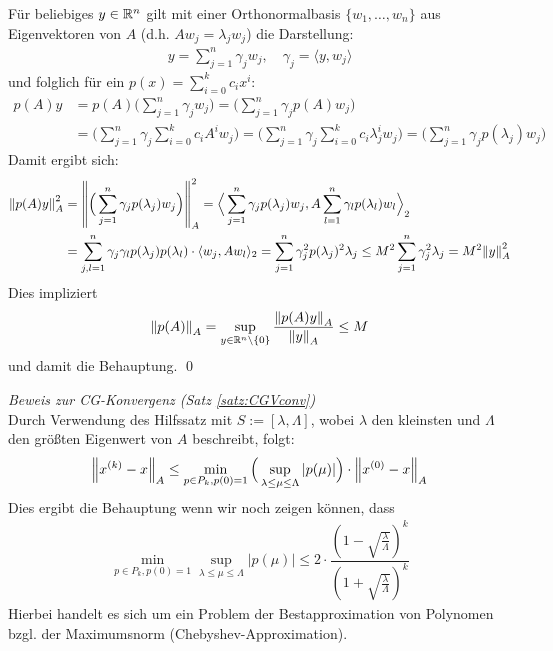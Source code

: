 Für beliebiges $y\in\mathbb R^n$ gilt mit einer Orthonormalbasis $\{w_1,\dots,w_n\}$ aus Eigenvektoren von $A$ 
(d.h. $Aw_j = \lambda_jw_j$) die Darstellung:
%
\begin{align*}
  y=\sum_{j=1}^{n}\gamma_j w_j,
  \quad \gamma_j = \langle y, w_j\rangle
\end{align*}
%
und folglich für ein $p(x) = \sum_{i=0}^{k} c_i x^i$:
\begin{align*}
  p(A)y 
  &= p(A) \Bigg(\sum_{j=1}^{n}\gamma_j w_j \Bigg) 
  = \Bigg(\sum_{j=1}^{n}\gamma_j p(A)w_j \Bigg) \\
  &= \Bigg(\sum_{j=1}^{n}\gamma_j \sum_{i=0}^{k} c_i A^iw_j \Bigg) 
  = \Bigg(\sum_{j=1}^{n}\gamma_j \sum_{i=0}^{k} c_i \lambda_j^iw_j \Bigg) 
  = \Bigg(\sum_{j=1}^{n}\gamma_j p(\lambda_j)w_j \Bigg)
\end{align*}
%
Damit ergibt sich:
\begin{align*}
  \vertn{2}{p(A)y}_A^2 
  &= \vertn{2}{
    \Big(\sum_{j=1}^{n}\gamma_j p(\lambda_j)w_j\Big)
  }_A^2
  = \Big\langle \sum_{j=1}^{n}\gamma_j p(\lambda_j)w_j, A\sum_{l=1}^{n}\gamma_l p(\lambda_l)w_l\Big\rangle_2\\
  &= \sum_{j,l=1}^{n} \gamma_j\gamma_l p(\lambda_j)p(\lambda_l) \cdot\langle w_j,Aw_l\rangle_2
  = \sum_{j=1}^{n} \gamma_j^2 p(\lambda_j)^2 \lambda_j 
  \leq M^2 \sum_{j=1}^{n} \gamma_j^2 \lambda_j 
  = M^2 \vertn{2}{y}_A^2
\end{align*}
%
Dies impliziert 
%
\begin{align*}
  \vertn{2}{p(A)}_A = \sup_{y\in\R^n\backslash\{0\}} \dfrac{\vertn{2}{p(A)y}_A}{\vertn{2}{y}_A}\leq M
\end{align*}
%
und damit die Behauptung. \qed 

\textit{Beweis zur CG-Konvergenz (Satz \ref{satz:CGVconv})}\\
Durch Verwendung des Hilfssatz mit $S:=[\lambda, \Lambda]$, 
wobei $\lambda$ den kleinsten und $\Lambda$ den größten Eigenwert von $A$ beschreibt, folgt:
%
\begin{align*}
  \vertn{2}{x^{(k)}-x}_A \leq \min_{p\in P_{k}, p(0)=1} 
  \Big(\sup_{\lambda\leq\mu\leq\Lambda}|p(\mu)|\Big)\cdot\vertn{2}{x^{(0)}-x}_A 
\end{align*}
%
Dies ergibt die Behauptung wenn wir noch zeigen können, dass 
%
\begin{align*}
  \min_{p\in P_{k}, p(0)=1} \sup_{\lambda\leq\mu\leq\Lambda}|p(\mu)| 
  \leq 2\cdot \dfrac{(1-\sqrt{\tfrac{\lambda}{\Lambda}})^k}{(1+\sqrt{\tfrac{\lambda}{\Lambda}})^k}
\end{align*}
%
Hierbei handelt es sich um ein Problem der Bestapproximation von Polynomen bzgl. 
der Maximumsnorm (Chebyshev-Approximation).

